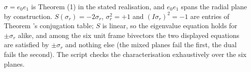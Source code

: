 $\sigma = e_0 e_1$ is Theorem (1) in the stated realisation, and $e_0 e_1$ spans the radial plane by construction. $S(\sigma_r) = -2\sigma_r$, $\sigma_r^2 = +1$ and $(I\sigma_r)^2 = -1$ are entries of Theorem 's conjugation table; $S$ is linear, so the eigenvalue equation holds for $\pm\sigma_r$ alike, and among the six unit frame bivectors the two displayed equations are satisfied by $\pm\sigma_r$ and nothing else (the mixed planes fail the first, the dual fails the second). The script checks the characterisation exhaustively over the six planes.

